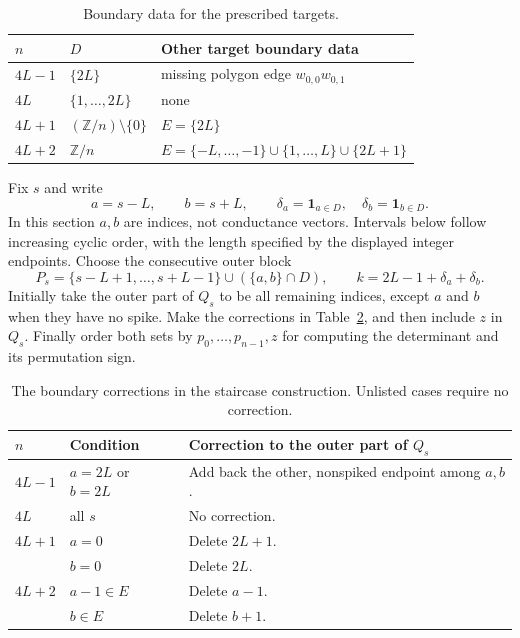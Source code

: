 \documentclass[11pt]{article}
\theoremstyle{definition}
\begin{document}
\begin{table}[htbp]
\centering
\begin{tabular}{@{}lll@{}}
\toprule
$n$ & $D$ & Other target boundary data\\
\midrule
$4L-1$ & $\{2L\}$ & missing polygon edge $w_{0,0}w_{0,1}$\\
$4L$ & $\{1,\ldots,2L\}$ & none\\
$4L+1$ & $(\mathbb Z/n)\setminus\{0\}$ & $E=\{2L\}$\\
$4L+2$ & $\mathbb Z/n$ &
$E=\{-L,\ldots,-1\}\cup\{1,\ldots,L\}\cup\{2L+1\}$\\
\bottomrule
\end{tabular}
\caption{Boundary data for the prescribed targets.}
\label{tab:target-boundary}
\end{table}

Fix $s$ and write
\[
 a=s-L,\qquad b=s+L,\qquad
 \delta_a=\mathbf1_{a\in D},\quad \delta_b=\mathbf1_{b\in D}.
\]
In this section $a,b$ are indices, not conductance vectors.
Intervals below follow increasing cyclic order, with the length
specified by the displayed integer endpoints. Choose the consecutive
outer block
\begin{equation}
 P_s=\{s-L+1,\ldots,s+L-1\}
       \cup(\{a,b\}\cap D),
 \qquad k=2L-1+\delta_a+\delta_b.
 \label{eq:P-set}
\end{equation}
Initially take the outer part of $Q_s$ to be all remaining indices,
except $a$ and $b$ when they have no spike. Make the corrections
in Table~\ref{tab:corrections}, and then include $z$ in $Q_s$.
Finally order both sets by $p_0,\ldots,p_{n-1},z$ for computing
the determinant and its permutation sign.

\begin{table}[htbp]
\centering
\small
\begin{tabular}{@{}p{.12\linewidth}p{.31\linewidth}p{.49\linewidth}@{}}
\toprule
$n$ & Condition & Correction to the outer part of $Q_s$\\
\midrule
$4L-1$ & $a=2L$ or $b=2L$ &
Add back the other, nonspiked endpoint among $a,b$.\\[3pt]
$4L$ & all $s$ & No correction.\\[3pt]
$4L+1$ & $a=0$ & Delete $2L+1$.\\
       & $b=0$ & Delete $2L$.\\[3pt]
$4L+2$ & $a-1\in E$ & Delete $a-1$.\\
       & $b\in E$ & Delete $b+1$.\\
\bottomrule
\end{tabular}
\caption{The boundary corrections in the staircase construction.
Unlisted cases require no correction.}
\label{tab:corrections}
\end{table}
\end{document}
